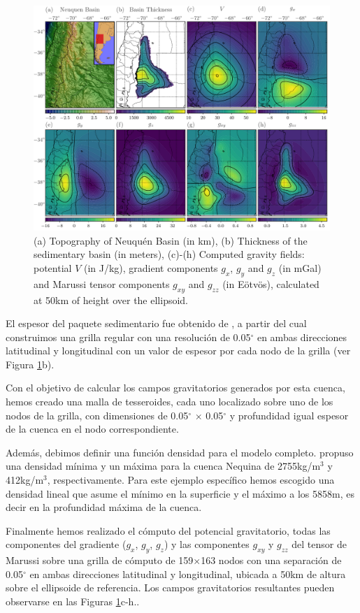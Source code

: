 \documentclass[a4paper,10pt]{article}
\begin{document}
\begin{figure}[b!]
\centering
\includegraphics[width=0.975\linewidth]{../manuscript/figures/neuquen-basin.pdf}
\caption{(a) Topography of Neuqu\'en Basin (in km),
         (b) Thickness of the sedimentary basin (in meters),
         (c)-(h) Computed gravity fields: potential $V$ (in J/kg), gradient components $g_x$, $g_y$ and $g_z$ (in mGal) and Marussi tensor components $g_{xy}$ and $g_{zz}$ (in Eötvös), calculated at 50km of height over the ellipsoid.}
\label{fig:neuquen-basin}
\end{figure}

El espesor del paquete sedimentario fue obtenido de \citet{Heine2007}, a partir del cual construimos una grilla regular con una resolución de 0.05$^\circ$ en ambas direcciones latitudinal y longitudinal con un valor de espesor por cada nodo de la grilla (ver Figura \ref{fig:neuquen-basin}b).

Con el objetivo de calcular los campos gravitatorios generados por esta cuenca, hemos creado una malla de tesseroides, cada uno localizado sobre uno de los nodos de la grilla, con dimensiones de 0.05$^\circ$ $\times$ 0.05$^\circ$ y profundidad igual espesor de la cuenca en el nodo correspondiente.

Además, debimos definir una función densidad para el modelo completo.
\citet{Sigismondi2012} propuso una densidad mínima y un máxima para la cuenca Nequina de 2755kg/m$^3$ y 412kg/m$^3$, respectivamente.
Para este ejemplo específico hemos escogido una densidad lineal que asume el mínimo en la superficie y el máximo a los 5858m, es decir en la profundidad máxima de la cuenca.

Finalmente hemos realizado el cómputo del potencial gravitatorio, todas las componentes del gradiente ($g_x$, $g_y$, $g_z$) y las componentes $g_{xy}$ y $g_{zz}$ del tensor de Marussi sobre una grilla de cómputo de 159$\times$163 nodos con una separación de 0.05$^\circ$ en ambas direcciones latitudinal y longitudinal, ubicada a 50km de altura sobre el ellipsoide de referencia.
Los campos gravitatorios resultantes pueden observarse en las Figuras \ref{fig:neuquen-basin}c-h..




\end{document}
